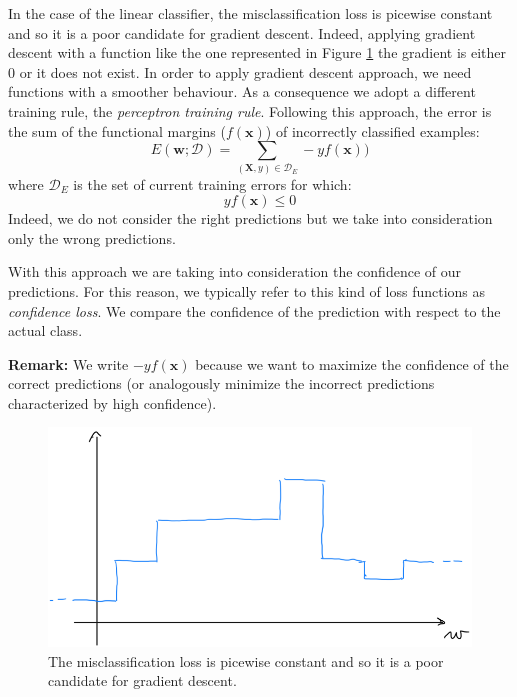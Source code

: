 In the case of the linear classifier, the misclassification loss is picewise constant and so it is a poor candidate for gradient descent. Indeed, applying gradient descent with a function like the one represented in Figure \ref{fig:scalini} the gradient is either 0 or it does not exist. In order to apply gradient descent approach, we need functions with a smoother behaviour. As a consequence we adopt a different training rule, the \textit{perceptron training rule}. Following this approach, the error is the sum of the functional margins ($f(\pmb{x})$) of incorrectly classified examples:
\begin{equation}
    \label{perceptronTrainingRule1}
    E(\pmb{w}; \mathcal{D}) = \sum_{(\pmb{X},y) \in \mathcal{D}_E} -y f(\pmb{x}))
\end{equation}
where $\mathcal{D}_E$ is the set of current training errors for which:
$$y f(\pmb{x}) \leq 0$$
Indeed, we do not consider the right predictions but we take into consideration only the wrong predictions. \newline

With this approach we are taking into consideration the confidence of our predictions. For this reason, we typically refer to this kind of loss functions as \textit{confidence loss}. We compare the confidence of the prediction with respect to the actual class. \newline

\textbf{Remark:} We write $ - y f(\pmb{x})$ because we want to maximize the confidence of the correct predictions (or analogously minimize the incorrect predictions characterized by high confidence). \newline

\begin{figure}
    \centering
    \includegraphics[width=\textwidth]{images/gradini.png}
    \caption{The misclassification loss is picewise constant and so it is a poor candidate for gradient descent.}
    \label{fig:scalini}
\end{figure}

